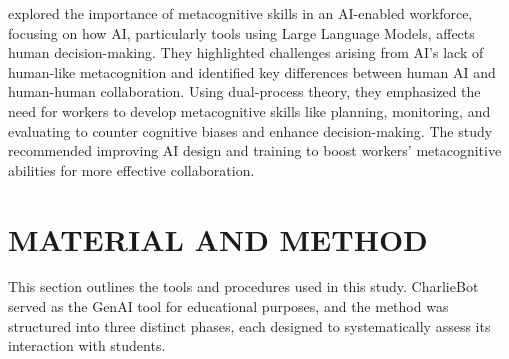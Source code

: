 \documentclass[a4paper,twoside]{article}
\begin{document}


\cite{Sidra24} explored the importance of metacognitive skills in an AI-enabled
workforce, focusing on how AI, particularly tools using Large Language Models,
affects human decision-making. They highlighted challenges arising from AI's
lack of human-like metacognition and identified key differences between human
AI and human-human collaboration. Using dual-process theory, they emphasized the
need for workers to develop metacognitive skills like planning, monitoring, and
evaluating to counter cognitive biases and enhance decision-making. The study
recommended improving AI design and training to boost workers' metacognitive
abilities for more effective collaboration.

\section{\uppercase{Material and Method}}

This section outlines the tools and procedures used in this study. CharlieBot
served as the GenAI tool for educational purposes, and the method was structured
into three distinct phases, each designed to systematically assess its
interaction with students.
\end{document}
